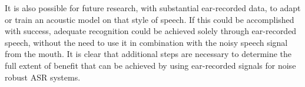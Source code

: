 \DIFdelbegin {}\DIFdelend %

It is also possible for future research, with substantial ear-recorded data, to adapt or train an acoustic model on that style of speech.  If this could be accomplished with success, adequate recognition could be achieved solely through ear-recorded speech, without the need to use it in combination with the noisy speech signal from the mouth.  It is clear that additional steps are necessary to determine the full extent of benefit that can be achieved by using ear-recorded signals for noise robust ASR systems.




% 
% 
% 
